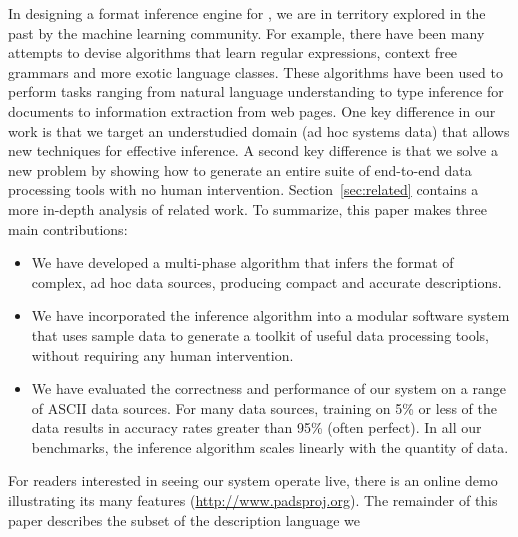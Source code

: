 In designing a format inference engine for \pads{}, we are in
territory explored in the past by the machine learning community.  For
example, there have been many attempts to devise algorithms that learn
regular expressions, context free grammars and more exotic language
classes.  These algorithms have been used to perform tasks ranging
from natural language understanding to type inference for \xml{}
documents to information extraction from web pages.  One key
difference in our work is that we target an
understudied domain (ad hoc systems data) that allows new techniques for
effective inference.  A second key difference is that we solve a
new problem by showing how to generate an entire suite of end-to-end
data processing tools with no human intervention.  
Section~\ref{sec:related} contains a more in-depth analysis of related
work.  To summarize, this paper makes three main contributions:
\begin{itemize}
\item We have developed a multi-phase algorithm 
that infers the format of complex, ad hoc data sources,
producing compact and accurate \pads{} descriptions.  

\item We have incorporated the inference algorithm into 
a modular software system that uses sample data to
generate a toolkit of useful data processing tools,
without requiring any human intervention.
 
\item We have evaluated the correctness and performance of
our system on a range of ASCII data sources.  For many data
sources, training on 5\% or less of the data results in
accuracy rates greater than 95\% (often perfect).  
In all our benchmarks, the 
inference algorithm scales linearly with the quantity of
data.
\end{itemize}
\noindent
For readers interested in seeing our system operate live, 
there is an online demo illustrating its many features
(\url{http://www.padsproj.org}).  The remainder of this paper
describes the subset of the \pads{} description language we
